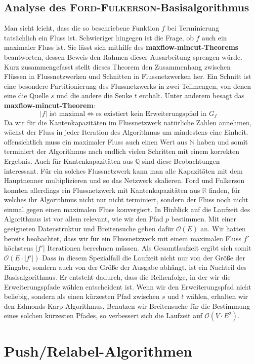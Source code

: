 \documentclass[12pt,a4paper,titlepage,onecolumn,ngerman]{scrartcl}
\theoremstyle{definition}
\theoremstyle{remark}
\newcommand{\ff}{\textsc{Ford-Fulkerson}}
\newcommand{\pr}{Push/Relabel}
\begin{document}
\subsection{Analyse des \ff -Basisalgorithmus}
Man sieht leicht, dass die so beschriebene Funktion $f$ bei Terminierung tatsächlich ein Fluss ist.
Schwieriger hingegen ist die Frage, ob $f$ auch ein maximaler Fluss ist.
Sie lässt sich mithilfe des \textbf{maxflow-mincut-Theorems} beantworten, dessen Beweis den Rahmen dieser Ausarbeitung sprengen würde.
Kurz zusammengefasst stellt dieses Theorem den Zusammenhang zwischen Flüssen in Flussnetzwerken und Schnitten in Flussnetzwerken her.
Ein Schnitt ist eine besondere Partitionierung des Flussnetzwerks in zwei Teilmengen, von denen eine die Quelle $s$ und die andere die Senke $t$ enthält.
Unter anderem besagt das \textbf{maxflow-mincut-Theorem}:
\begin{equation}
    \lvert f\rvert\text{ ist maximal} \Leftrightarrow \text{es existiert kein Erweiterungspfad in $G_{f}$}
\end{equation}
Da wir für die Kantenkapazitäten im Flussnetzwerk natürliche Zahlen annehmen, wächst der Fluss in jeder Iteration des Algorithmus um mindestens eine Einheit.
offensichtlich muss ein maximaler Fluss auch einen Wert aus $\mathbb{N}$ haben und somit terminiert der Algorithmus nach endlich vielen Schritten mit einem korrekten Ergebnis.
Auch für Kantenkapazitäten aus $\mathbb{Q}$ sind diese Beobachtungen interessant.
Für ein solches Flussnetzwerk kann man alle Kapazitäten mit dem Hauptnenner multiplizieren und so das Netzwerk \glqq skalieren\grqq{}.
Ford und Fulkerson konnten allerdings ein Flussnetzwerk mit Kantenkapazitäten aus $\mathbb{R}$ finden, für welches ihr Algorithmus nicht nur nicht terminiert, sondern der Fluss noch nicht einmal gegen einen maximalen Fluss konvergiert.
\medbreak
In Hinblick auf die Laufzeit des Algorithmus ist vor allem relevant, wie wir den Pfad $p$ bestimmen.
Mit einer geeigneten Datenstruktur und Breitensuche geben \cite{Cormen09} dafür $\mathcal{O}(E)$ an.
Wir hatten bereits beobachtet, dass wir für ein Flussnetzwerk mit einem maximalen Fluss $f'$ höchstens $\lvert f'\rvert$ Iterationen berechnen müssen.
Als Gesamtlaufzeit ergibt sich somit $\mathcal{O}(E\cdot\lvert f'\rvert)$
Dass in diesem Spezialfall die Laufzeit nicht nur von der Größe der Eingabe, sondern auch von der Größe der Ausgabe abhängt, ist ein Nachteil des Basisalgorithmus.
Er entsteht dadurch, dass die Reihenfolge, in der wir die Erweiterungspfade wählen entscheident ist.
Wenn wir den Erweiterungspfad nicht beliebig, sondern als einen kürzesten Pfad zwischen $s$ und $t$ wählen, erhalten wir den Edmonds-Karp-Algorithmus.
Benutzen wir Breitensuche für die Bestimmung eines solchen kürzesten Pfades, so verbessert sich die Laufzeit auf $\mathcal{O}(V\cdot E^2)$.

\section{\pr -Algorithmen}

\newpage
\printbibliography
\end{document}
